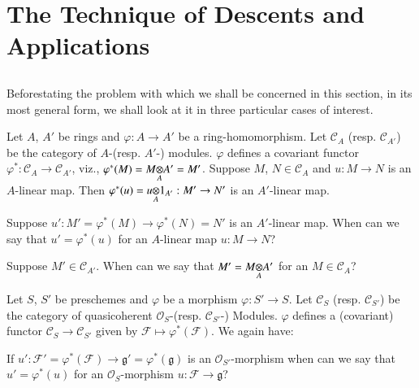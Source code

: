 \chapter{The Technique of Descents and Applications}\label{chap7}

\section{}\label{chap7-sec7.1}

Before\pageoriginale stating the problem with which we shall be
concerned in this section, in its most general form, we shall look at
it in three particular cases of interest.

\setcounter{exam}{0}
\begin{exam}\label{chap7-exam1}
Let $A$, $A'$ be rings and $\varphi:A\to A'$ be a
ring-homomorphism. Let $\mathscr{C}_{A}$ (resp. $\mathscr{C}_{A'}$) be
the category of $A$-(resp. $A'$-) modules. $\varphi$ defines a
covariant functor $\varphi^{\ast}:\mathscr{C}_{A}\to
\mathscr{C}_{A'}$, viz.,
$\varphi^{\ast}(M)=\foprod{M}{A'}{A}=M'$. Suppose $M$,
$N\in\mathscr{C}_{A}$ and $u:M\to N$ is an $A$-linear map. Then
$\varphi^{\ast}(u)=\foprod{u}{1_{A'}}{A}:M'\to N'$ is an $A'$-linear map.
\end{exam}

\begin{problem}\label{exam1-prob1}
Suppose $u':M'=\varphi^{\ast}(M)\to \varphi^{\ast}(N)=N'$ is an
$A'$-linear map. When can we say that $u'=\varphi^{\ast}(u)$ for an
$A$-linear map $u:M\to N$?
\end{problem}

\begin{problem}\label{exam1-prob2}
Suppose $M'\in\mathscr{C}_{A'}$. When can we say that
$M'=\foprod{M}{A'}{A}$ for an $M\in\mathscr{C}_{A}$?
\end{problem}

\begin{exam}\label{chap7-exam2}
Let $S$, $S'$ be preschemes and $\varphi$ be a morphism $\varphi:S'\to
S$. Let $\mathscr{C}_{S}$ (resp. $\mathscr{C}_{S'}$) be the category
of quasicoherent $\mathscr{O}_{S}$-(resp. $\mathscr{C}_{S'}$-)
Modules. $\varphi$ defines a (covariant) functor $\mathscr{C}_{S}\to
\mathscr{C}_{S'}$ given by $\mathscr{F}\mapsto
\varphi^{\ast}(\mathscr{F})$. We again have:
\end{exam}

\setcounter{problem}{0}
\begin{problem}
If $u':\mathscr{F}'=\varphi^{\ast}(\mathscr{F})\to
\mathfrak{g}'=\varphi^{\ast}(\mathfrak{g})$ is an
$\mathscr{O}_{S'}$-morphism when can we say that
$u'=\varphi^{\ast}(u)$ for an $\mathscr{O}_{S}$-morphism
$u:\mathscr{F}\to \mathfrak{g}$?
\end{problem}


